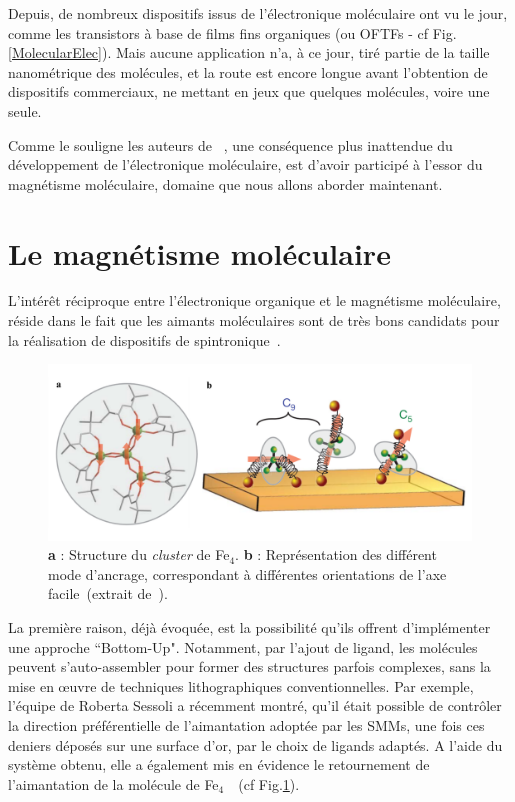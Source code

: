 Depuis, de nombreux dispositifs issus de l'électronique moléculaire ont vu le jour, comme les  transistors à base de films fins organiques (ou OFTFs - cf Fig.\ref{MolecularElec}). Mais aucune application n'a, à ce jour, tiré partie de la taille nanométrique des molécules, et la route est encore longue avant l'obtention de dispositifs commerciaux, ne mettant en jeux que quelques molécules, voire une seule.

Comme le souligne les auteurs de~\cite{Gatteschi2006} , une conséquence plus inattendue du développement de l'électronique moléculaire, est d'avoir participé à l'essor du magnétisme moléculaire, domaine que nous allons aborder maintenant.


\section{Le magnétisme moléculaire}
L’intérêt réciproque entre l'électronique organique et le magnétisme moléculaire, réside dans le fait que les aimants moléculaires sont de très bons candidats pour la réalisation de dispositifs de spintronique~\cite{Bogani2008,Sanvito2011}.

\begin{figure}
\centering \includegraphics[scale=0.45]{Spintronique/MolecularMag2/MolecularMag2.pdf}
\caption{\textbf{a} : Structure du \textit{cluster} de Fe$_4$. \textbf{b} : Représentation des différent mode d'ancrage, correspondant à différentes orientations de l'axe facile~(extrait de~\cite{Mannini2010}).}
\label{MolecularMag2}
\end{figure}

La première raison, déjà évoquée, est la possibilité qu'ils offrent d'implémenter une approche ``Bottom-Up".
Notamment, par l'ajout de ligand, les molécules peuvent s'auto-assembler pour former des structures parfois complexes, sans la mise en œuvre de techniques lithographiques conventionnelles. Par exemple, l'équipe de Roberta Sessoli a récemment montré, qu'il était possible de contrôler la direction préférentielle de l'aimantation adoptée par les SMMs, une fois ces deniers déposés sur une surface d'or, par le choix de ligands adaptés. A l'aide du système obtenu, elle a également mis en évidence le retournement de l'aimantation de la molécule de Fe$_{4}$~\cite{Mannini2010}~(cf Fig.\ref{MolecularMag2}).

